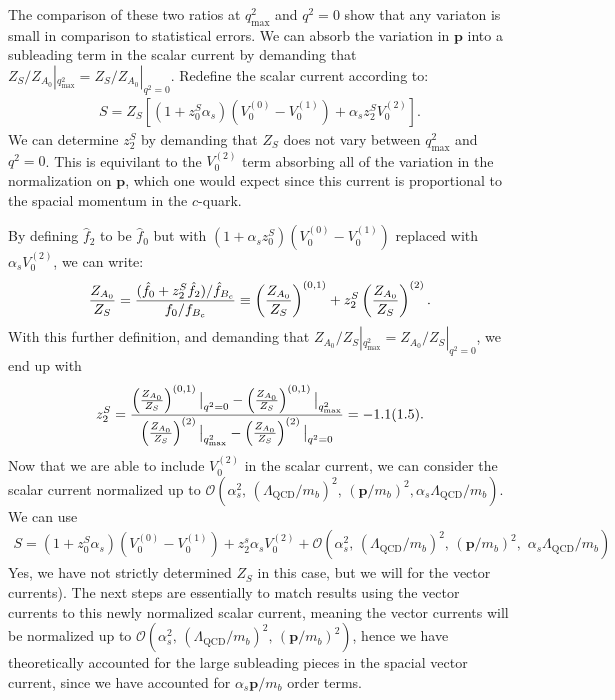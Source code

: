 The comparison of these two ratios at $q^2_{\text{max}}$ and $q^2=0$ show that any variaton is small in comparison to statistical errors. We can absorb the variation in ${\textbf{p}}$ into a subleading term in the scalar current by demanding that $Z_{S}/Z_{A_0}|_{q^2_{\text{max}}} = Z_{S}/Z_{A_0}|_{q^2=0}$. Redefine the scalar current according to:
\begin{align}
 S = Z_{S} \left[ (1 + z^{S}_0 \alpha_s)( V_0^{(0)} - V_0^{(1)} ) + \alpha_s z^{S}_2 V_0^{(2)} \right].
\end{align}
We can determine $z_2^S$ by demanding that $Z_S$ does not vary between $q^2_{\text{max}}$ and $q^2=0$. This is equivilant to the $V_0^{(2)}$ term absorbing all of the variation in the normalization on ${\textbf{p}}$, which one would expect since this current is proportional to the spacial momentum in the $c$-quark.

By defining $\hat{f}_2$ to be $\hat{f}_0$ but with $(1+\alpha_s z_0^S)( V_0^{(0)} - V_0^{(1)} )$ replaced with $\alpha_s V_0^{(2)}$, we can write:
\begin{align}
	{Z_{A_0}\over Z_{S}} = { ( \hat{f}_0 + z^S_2 \hat{f}_2 )/ \hat{f}_{B_c}  \over f_0/f_{B_c} } \equiv \left({Z_{A_0}\over Z_{S}}\right)^{(0,1)} + z^S_2 \left({Z_{A_0}\over Z_{S}}\right)^{(2)}.
\end{align}
With this further definition, and demanding that ${Z_{A_0}/ Z_{S}}|_{q^2_{\text{max}}} = {Z_{A_0}/ Z_{S}}|_{q^2=0}$, we end up with
\begin{align}
	z^S_2 = { \left({Z_{A_0}\over Z_{S}}\right)^{(0,1)}\big\vert_{q^2=0} - \left({Z_{A_0}\over Z_{S}}\right)^{(0,1)}\big\vert_{q^2_{\text{max}}}
\over \left({Z_{A_0}\over Z_{S}}\right)^{(2)}\big\vert_{q^2_{\text{max}}} - \left({Z_{A_0}\over Z_{S}}\right)^{(2)}\big\vert_{q^2=0} }
 = -1.1(1.5).
\end{align}
Now that we are able to include $V_0^{(2)}$ in the scalar current, we can consider the scalar current normalized up to $\mathcal{O}(\alpha_s^2, \,(\Lambda_{\text{QCD}}/m_b)^2, \,({\textbf{p}}/m_b)^2, \alpha_s\Lambda_{\text{QCD}}/m_b )$. We can use
\begin{align}
  S = (1+z_0^S\alpha_s)( V_0^{(0)} - V_0^{(1)} ) + z_2^s\alpha_s V_0^{(2)} + \mathcal{O}(\alpha_s^2, \,(\Lambda_{\text{QCD}}/m_b)^2, \,({\textbf{p}}/m_b)^2,\,\, \alpha_s\Lambda_{\text{QCD}}/m_b )
\end{align}
Yes, we have not strictly determined $Z_S$ in this case, but we will for the vector currents). The next steps are essentially to match results using the vector currents to this newly normalized scalar current, meaning the vector currents will be normalized up to $\mathcal{O}(\alpha_s^2, \,(\Lambda_{\text{QCD}}/m_b)^2, \,({\textbf{p}}/m_b)^2 )$, hence we have theoretically accounted for the large subleading pieces in the spacial vector current, since we have accounted for $\alpha_s{\textbf{p}}/m_b$ order terms.

